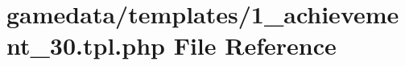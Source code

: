 \hypertarget{1__achievement__30_8tpl_8php}{\section{gamedata/templates/1\+\_\+achievement\+\_\+30.tpl.\+php File Reference}
\label{1__achievement__30_8tpl_8php}
}
